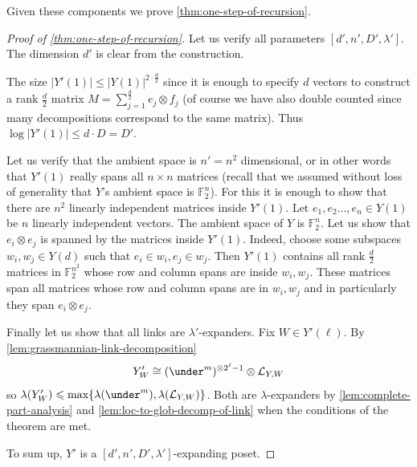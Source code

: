 \documentclass[10pt,a4paper]{article}
\newcommand{\prettyref}[1]{\cref{#1}}
\theoremstyle{definition}
\theoremstyle{remark}
\newcommand{\set}[1]{\{#1\}}
\newcommand{\F}{\mathbb{F}}
\renewcommand{\leq}{\leqslant}
\numberwithin{equation}{section}
\let\pref=\prettyref
\def\Y{Y}
\def\SL{\mathcal{L}}
\def\diml{d}
\def\dimlin{{\diml}}
\def\dimlout{\diml'}
\def\lambdao{\lambda'}
\def\dimm{\ell}
\def\degree{D}
\begin{document}

Given these components we prove \pref{thm:one-step-of-recursion}.
\begin{proof}[Proof of \pref{thm:one-step-of-recursion}]
    Let us verify all parameters \([\dimlout,n',\degree', \lambdao]\). The dimension \(\dimlout\) is clear from the construction. 
    
    The size \(|\Y'(1)| \leq |\Y(1)|^{2 \cdot \frac{\dimlin}{2}}\) since it is enough to specify \(\dimlin\) vectors to construct a rank \(\frac{\dimlin}{2}\) matrix \(M = \sum_{j=1}^{\frac{\dimlin}{2}} e_j \otimes f_j\) (of course we have also double counted since many decompositions correspond to the same matrix). Thus \(\log |\Y'(1)| \leq \dimlin \cdot \degree =\degree'\).

    Let us verify that the ambient space is \(n'=n^2\) dimensional, or in other words that \(\Y'(1)\) really spans all \(n \times n\) matrices (recall that we assumed without loss of generality that \(\Y\)'s ambient space is \(\mathbb{F}_2^n\)). For this it is enough to show that there are \(n^2\) linearly independent matrices inside \(\Y'(1)\). Let \(e_1,e_2\dots,e_n \in \Y(1)\) be \(n\) linearly independent vectors. The ambient space of \(Y\) is \(\F_2^n\). Let us show that \(e_i \otimes e_j\) is spanned by the matrices inside \(\Y'(1)\). Indeed, choose some subspaces \(w_i,w_j \in \Y(\dimlin)\) such that \(e_i \in w_i, e_j \in w_j\). Then $\Y'(1)$ contains all rank \(\frac{\dimlin}{2}\) matrices in $\F_2^{n^2}$ whose row and column spans are inside \(w_i,w_j\). These matrices span all matrices whose row and column spans are in \(w_i,w_j\) and in particularly they span \(e_i \otimes e_j\). 
       
    Finally let us show that all links are \(\lambdao\)-expanders. Fix \(W \in \Y' (\dimm)\). By \pref{lem:grassmannian-link-decomposition}
    \[\Y'_W \cong (\under^m)^{\otimes 2^{\dimm}-1} \otimes \SL_{\Y,W}\]
    so \(\lambda(\Y'_W) \leq \max \set{\lambda(\under^m), \lambda(\SL_{\Y,W})}\).
    Both are \(\lambda\)-expanders by \pref{lem:complete-part-analysis} and \pref{lem:loc-to-glob-decomp-of-link} when the conditions of the theorem are met.

    To sum up, \(\Y'\) is a \([\dimlout,n',\degree', \lambdao]\)-expanding poset.
\end{proof}
\end{document}

